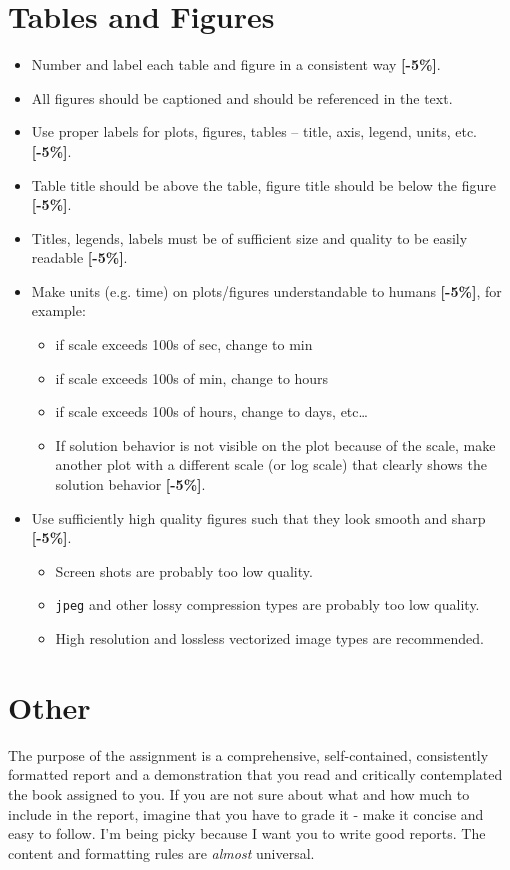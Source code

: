 \documentclass{article}
\begin{document}
\section{Tables and Figures}
\begin{itemize}
        \item Number and label each table and figure in a consistent way  {\color{red}\textbf{[-5\%]}}.
        \item All figures should be captioned and should be referenced in the 
                text. 
        \item    Use proper labels for plots, figures, tables – title, axis, legend, units, 
etc.  {\color{red}\textbf{[-5\%]}}.
\item   Table title should be above the table, figure title should be below the 
figure  {\color{red}\textbf{[-5\%]}}.
\item   Titles, legends, labels must be of sufficient size and quality to be 
easily readable  {\color{red}\textbf{[-5\%]}}.
\item    Make units (e.g. time) on plots/figures understandable to humans  {\color{red}\textbf{[-5\%]}}, 
for example:
\begin{itemize}
        \item   if scale exceeds 100s of sec, change to min
        \item   if scale exceeds 100s of min, change to hours
        \item   if scale exceeds 100s of hours, change to days, etc…
        \item   If solution behavior is not visible on the plot because of the 
                scale, make another plot with a different scale (or log scale) 
                that clearly shows the solution behavior  {\color{red}\textbf{[-5\%]}}.
\end{itemize}
\item    Use sufficiently high quality figures such that they look smooth and sharp 
 {\color{red}\textbf{[-5\%]}}.
\begin{itemize}
\item    Screen shots are probably too low quality.
\item   \texttt{jpeg} and other lossy compression types are probably too low quality.
\item   High resolution and lossless vectorized image types are recommended.
        \end{itemize}
        \end{itemize}

        \section{Other}
  The purpose of the assignment is a comprehensive, self-contained,
consistently formatted report and a demonstration that you read and critically
contemplated the book assigned to you.  If you are not sure about what and how
much to include in the report, imagine that you have to grade it - make it
concise and easy to follow. I'm being picky because I want you to write good
reports.  The content and formatting rules are \emph{almost} universal.  
\end{document}
